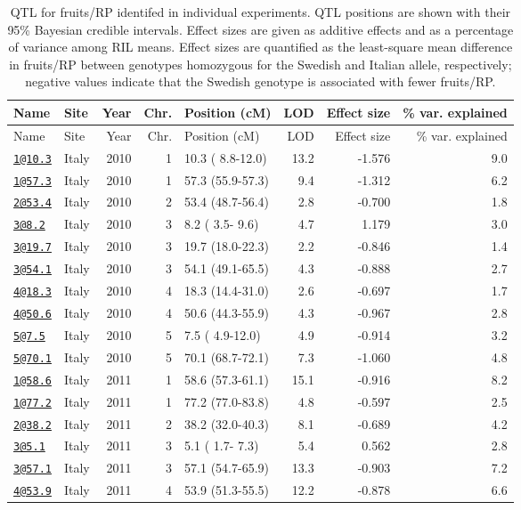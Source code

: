 \documentclass[]{article}
\begin{document}
\begin{longtable}[]{@{}llrrlrrr@{}}
\caption{\label{tab:individual-frut-qtl}QTL for fruits/RP identifed in individual experiments. QTL positions are shown with their 95\% Bayesian credible intervals. Effect sizes are given as additive effects and as a percentage of variance among RIL means. Effect sizes are quantified as the least-square mean difference in fruits/RP between genotypes homozygous for the Swedish and Italian allele, respectively; negative values indicate that the Swedish genotype is associated with fewer fruits/RP.}\tabularnewline
\toprule
Name & Site & Year & Chr. & Position (cM) & LOD & Effect size & \% var. explained\tabularnewline
\midrule
\endfirsthead
\toprule
Name & Site & Year & Chr. & Position (cM) & LOD & Effect size & \% var. explained\tabularnewline
\midrule
\endhead
\href{mailto:1@10.3}{\nolinkurl{1@10.3}} & Italy & 2010 & 1 & 10.3 ( 8.8-12.0) & 13.2 & -1.576 & 9.0\tabularnewline
\href{mailto:1@57.3}{\nolinkurl{1@57.3}} & Italy & 2010 & 1 & 57.3 (55.9-57.3) & 9.4 & -1.312 & 6.2\tabularnewline
\href{mailto:2@53.4}{\nolinkurl{2@53.4}} & Italy & 2010 & 2 & 53.4 (48.7-56.4) & 2.8 & -0.700 & 1.8\tabularnewline
\href{mailto:3@8.2}{\nolinkurl{3@8.2}} & Italy & 2010 & 3 & 8.2 ( 3.5- 9.6) & 4.7 & 1.179 & 3.0\tabularnewline
\href{mailto:3@19.7}{\nolinkurl{3@19.7}} & Italy & 2010 & 3 & 19.7 (18.0-22.3) & 2.2 & -0.846 & 1.4\tabularnewline
\href{mailto:3@54.1}{\nolinkurl{3@54.1}} & Italy & 2010 & 3 & 54.1 (49.1-65.5) & 4.3 & -0.888 & 2.7\tabularnewline
\href{mailto:4@18.3}{\nolinkurl{4@18.3}} & Italy & 2010 & 4 & 18.3 (14.4-31.0) & 2.6 & -0.697 & 1.7\tabularnewline
\href{mailto:4@50.6}{\nolinkurl{4@50.6}} & Italy & 2010 & 4 & 50.6 (44.3-55.9) & 4.3 & -0.967 & 2.8\tabularnewline
\href{mailto:5@7.5}{\nolinkurl{5@7.5}} & Italy & 2010 & 5 & 7.5 ( 4.9-12.0) & 4.9 & -0.914 & 3.2\tabularnewline
\href{mailto:5@70.1}{\nolinkurl{5@70.1}} & Italy & 2010 & 5 & 70.1 (68.7-72.1) & 7.3 & -1.060 & 4.8\tabularnewline
\href{mailto:1@58.6}{\nolinkurl{1@58.6}} & Italy & 2011 & 1 & 58.6 (57.3-61.1) & 15.1 & -0.916 & 8.2\tabularnewline
\href{mailto:1@77.2}{\nolinkurl{1@77.2}} & Italy & 2011 & 1 & 77.2 (77.0-83.8) & 4.8 & -0.597 & 2.5\tabularnewline
\href{mailto:2@38.2}{\nolinkurl{2@38.2}} & Italy & 2011 & 2 & 38.2 (32.0-40.3) & 8.1 & -0.689 & 4.2\tabularnewline
\href{mailto:3@5.1}{\nolinkurl{3@5.1}} & Italy & 2011 & 3 & 5.1 ( 1.7- 7.3) & 5.4 & 0.562 & 2.8\tabularnewline
\href{mailto:3@57.1}{\nolinkurl{3@57.1}} & Italy & 2011 & 3 & 57.1 (54.7-65.9) & 13.3 & -0.903 & 7.2\tabularnewline
\href{mailto:4@53.9}{\nolinkurl{4@53.9}} & Italy & 2011 & 4 & 53.9 (51.3-55.5) & 12.2 & -0.878 & 6.6\tabularnewline

\end{longtable}
\end{document}
